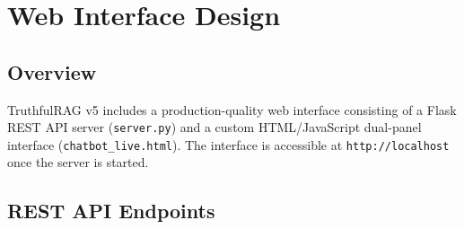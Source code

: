 \section{Web Interface Design}

\subsection{Overview}

TruthfulRAG v5 includes a production-quality web interface consisting of a
Flask REST API server (\texttt{server.py}) and a custom HTML/JavaScript dual-panel
interface (\texttt{chatbot\_live.html}). The interface is accessible at
\texttt{http://localhost} once the server is started.


\subsection{REST API Endpoints}

\begin{table}[H]
\centering
\caption{Flask REST API endpoints}
\label{tab:api}
\end{table}
